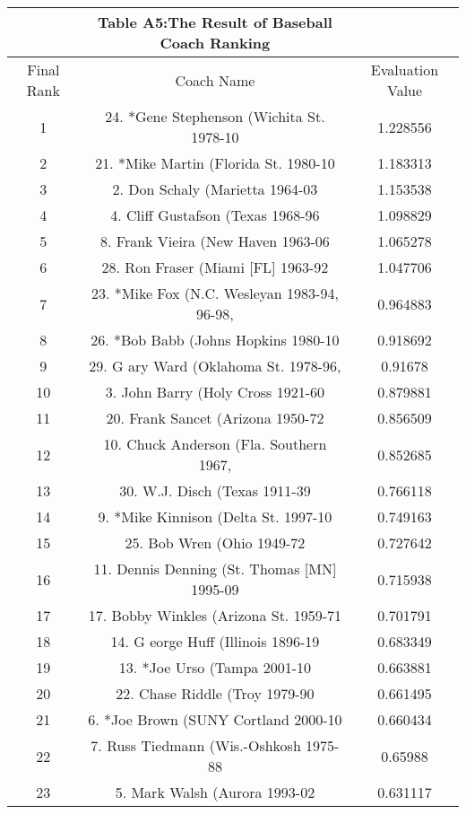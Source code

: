 \documentclass{mcmthesis}
\begin{document}
\begin{appendices}
\begin{longtable}{ccc}
 &Table A5:The Result of Baseball Coach Ranking&\\
 \hline
Final Rank & Coach Name & Evaluation Value\\
\hline
\endhead
1     & 24. *Gene Stephenson (Wichita St. 1978-10 & 1.228556 \\
    2     & 21. *Mike Martin (Florida St. 1980-10 & 1.183313 \\
    3     & 2. Don Schaly (Marietta 1964-03 & 1.153538 \\
    4     & 4. Cliff Gustafson (Texas 1968-96 & 1.098829 \\
    5     & 8. Frank Vieira (New Haven 1963-06 & 1.065278 \\
    6     & 28. Ron Fraser (Miami [FL] 1963-92 & 1.047706 \\
    7     & 23. *Mike Fox (N.C. Wesleyan 1983-94, 96-98, & 0.964883 \\
    8     & 26. *Bob Babb (Johns Hopkins 1980-10 & 0.918692 \\
    9     & 29. G ary Ward (Oklahoma St. 1978-96, & 0.91678 \\
    10    & 3. John Barry (Holy Cross 1921-60 & 0.879881 \\
    11    & 20. Frank Sancet (Arizona 1950-72 & 0.856509 \\
    12    & 10. Chuck Anderson (Fla. Southern 1967, & 0.852685 \\
    13    & 30. W.J. Disch (Texas 1911-39 & 0.766118 \\
    14    & 9. *Mike Kinnison (Delta St. 1997-10 & 0.749163 \\
    15    & 25. Bob Wren (Ohio 1949-72 & 0.727642 \\
    16    & 11. Dennis Denning (St. Thomas [MN] 1995-09 & 0.715938 \\
    17    & 17. Bobby Winkles (Arizona St. 1959-71 & 0.701791 \\
    18    & 14. G eorge Huff (Illinois 1896-19 & 0.683349 \\
    19    & 13. *Joe Urso (Tampa 2001-10 & 0.663881 \\
    20    & 22. Chase Riddle (Troy 1979-90 & 0.661495 \\
    21    & 6. *Joe Brown (SUNY Cortland 2000-10 & 0.660434 \\
    22    & 7. Russ Tiedmann (Wis.-Oshkosh 1975-88 & 0.65988 \\
    23    & 5. Mark Walsh (Aurora 1993-02 & 0.631117 \\

\end{longtable}
\end{appendices}
\end{document}
